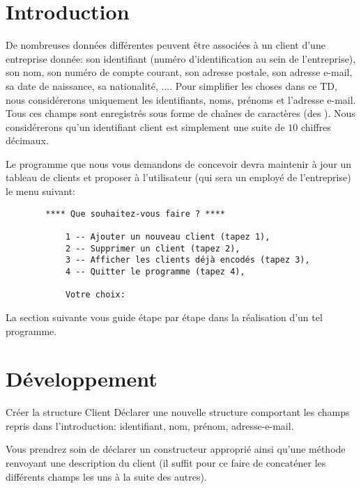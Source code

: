 \documentclass[a4paper,11pt]{style-esi/td}
\begin{document}

\section{Introduction}

	De nombreuses données différentes peuvent être associées à un client 
	d'une entreprise donnée: son identifiant (numéro d'identification au sein de l'entreprise), son nom, son numéro de compte courant, son adresse postale, son adresse e-mail, sa date de naissance, sa nationalité, .... Pour simplifier les choses dans ce TD, nous considérerons uniquement les identifiants, noms, prénoms et l'adresse e-mail. Tous ces champs sont enregistr\'es sous forme de cha\^ines de caract\`eres (des ). Nous considérerons qu'un identifiant client est simplement une suite de $10$ chiffres d\'ecimaux.	

	Le programme que nous vous demandons de concevoir devra maintenir \`a jour un tableau de clients et proposer \`a l'utilisateur (qui sera un employ\'e de l'entreprise) le menu suivant:
	
	\begin{verbatim}
		**** Que souhaitez-vous faire ? ****
		
			1 -- Ajouter un nouveau client (tapez 1),
			2 -- Supprimer un client (tapez 2),
			3 -- Afficher les clients déjà encodés (tapez 3),
			4 -- Quitter le programme (tapez 4),
			
			Votre choix: 
	\end{verbatim}
	
La section suivante vous guide étape par étape dans la réalisation d'un tel programme.

\section{D\'eveloppement}


 	\begin{Exercice}{Créer la structure Client}
		D\'eclarer une nouvelle structure  comportant les champs repris dans l'introduction: identifiant, nom, prénom, adresse-e-mail.
		
		Vous prendrez soin de d\'eclarer un constructeur appropri\'e ainsi qu'une m\'ethode  renvoyant une description du client (il suffit pour ce faire de concat\'ener les diff\'erents champs les uns \`a la suite des autres).
		
	\end{Exercice} 
	
\end{document}
